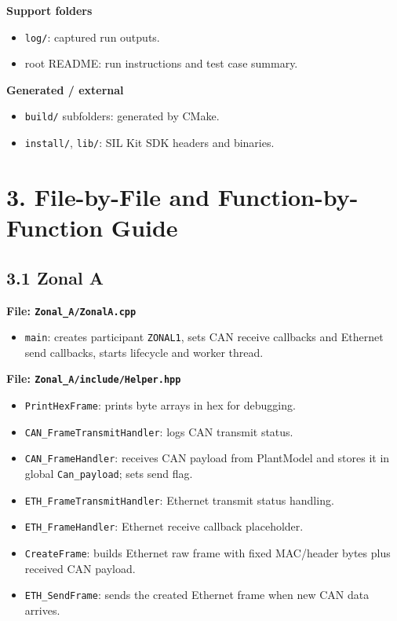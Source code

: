 \documentclass[11pt,a4paper]{article}
\begin{document}
\textbf{Support folders}
\begin{itemize}
  \item \texttt{log/}: captured run outputs.
  \item root README: run instructions and test case summary.
\end{itemize}

\textbf{Generated / external}
\begin{itemize}
  \item \texttt{build/} subfolders: generated by CMake.
  \item \texttt{install/}, \texttt{lib/}: SIL Kit SDK headers and binaries.
\end{itemize}

\section*{3. File-by-File and Function-by-Function Guide}

\subsection*{3.1 Zonal A}
\textbf{File: \texttt{Zonal\_A/ZonalA.cpp}}
\begin{itemize}
  \item \texttt{main}: creates participant \texttt{ZONAL1}, sets CAN receive callbacks and Ethernet send callbacks, starts lifecycle and worker thread.
\end{itemize}

\textbf{File: \texttt{Zonal\_A/include/Helper.hpp}}
\begin{itemize}
  \item \texttt{PrintHexFrame}: prints byte arrays in hex for debugging.
  \item \texttt{CAN\_FrameTransmitHandler}: logs CAN transmit status.
  \item \texttt{CAN\_FrameHandler}: receives CAN payload from PlantModel and stores it in global \texttt{Can\_payload}; sets send flag.
  \item \texttt{ETH\_FrameTransmitHandler}: Ethernet transmit status handling.
  \item \texttt{ETH\_FrameHandler}: Ethernet receive callback placeholder.
  \item \texttt{CreateFrame}: builds Ethernet raw frame with fixed MAC/header bytes plus received CAN payload.
  \item \texttt{ETH\_SendFrame}: sends the created Ethernet frame when new CAN data arrives.
\end{itemize}
\end{document}
